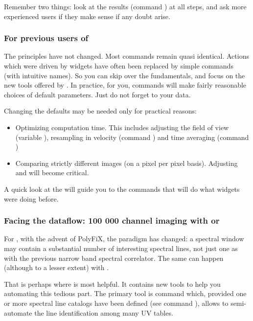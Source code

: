 Remember two things: look at the results (command ) at 
all steps, and ask more experienced users if they make sense if
any doubt arise.

\subsubsection{For previous users of \mapping{} }
The principles have not changed. Most commands remain quasi identical. 
Actions which were driven by widgets have often been replaced by simple 
commands (with intuitive names). So you can skip over the fundamentals, 
and focus on the new tools offered by \imager{}. In practice, for you, 
commands will make fairly reasonable choices of default parameters. 
Just do not forget to  your data.

Changing the defaults may be needed only for practical reasons:
\begin{itemize}\itemsep 0pt
\item Optimizing computation time. This includes adjusting
the field of view (variable ), resampling
in velocity (command ) and time averaging
(command )
\item Comparing strictly different images (on a pixel per pixel
basis). Adjusting  and  will
become critical.
\end{itemize}

A quick look at the  will guide you to the commands
that will do what widgets were doing before.

\subsubsection{Facing the dataflow: 100 000 channel imaging with \NOEMA{} or \ALMA{} }

For \NOEMA{}, with the advent of PolyFiX, the paradigm has changed: a spectral window
may contain a substantial number of interesting spectral lines, not
just one as with the previous narrow band spectral correlator. The same
can happen (although to a lesser extent) with \ALMA{}.

That is perhaps where \imager{} is most helpful. It contains new tools 
to help you automating this tedious part.  The primary tool is command 
 which, provided one or more spectral line catalogs 
have been defined (see command ), allows to semi-automate 
the line identification among many UV tables. 

